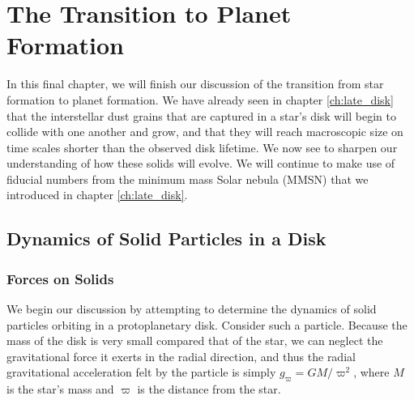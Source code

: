 \chapter{The Transition to Planet Formation}
\label{ch:planets}


In this final chapter, we will finish our discussion of the transition from star formation to planet formation. We have already seen in chapter \ref{ch:late_disk} that the interstellar dust grains that are captured in a star's disk will begin to collide with one another and grow, and that they will reach macroscopic size on time scales shorter than the observed disk lifetime. We now see to sharpen our understanding of how these solids will evolve. We will continue to make use of fiducial numbers from the minimum mass Solar nebula (MMSN) that we introduced in chapter \ref{ch:late_disk}.

\section{Dynamics of Solid Particles in a Disk}

\subsection{Forces on Solids}

We begin our discussion by attempting to determine the dynamics of solid particles orbiting in a protoplanetary disk. Consider such a particle. Because the mass of the disk is very small compared that of the star, we can neglect the gravitational force it exerts in the radial direction, and thus the radial gravitational acceleration felt by the particle is simply $g_\varpi = G M/\varpi^2$, where $M$ is the star's mass and $\varpi$ is the distance from the star. 


